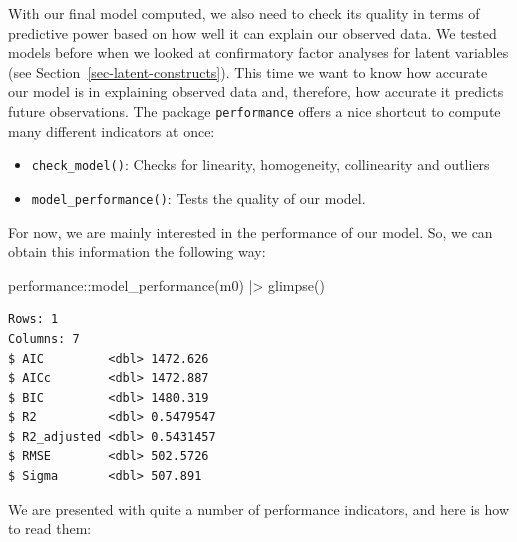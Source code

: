 \documentclass[
  letterpaper,
]{krantz}
\makeatletter
\newenvironment{Shaded}{\begin{snugshade}}{\end{snugshade}}
\newcommand{\FunctionTok}[1]{\textcolor[rgb]{0.28,0.35,0.67}{#1}}
\newcommand{\NormalTok}[1]{\textcolor[rgb]{0.00,0.23,0.31}{#1}}
\newcommand{\SpecialCharTok}[1]{\textcolor[rgb]{0.37,0.37,0.37}{#1}}
\newenvironment{kframe}{%
\medskip{}
\setlength{\fboxsep}{.8em}
 \def\at@end@of@kframe{}%
 \ifinner\ifhmode%
  \def\at@end@of@kframe{\end{minipage}}%
  \begin{minipage}{\columnwidth}%
 \fi\fi%
 \def\FrameCommand##1{\hskip\@totalleftmargin \hskip-\fboxsep
 \colorbox{shadecolor}{##1}\hskip-\fboxsep
     \hskip-\linewidth \hskip-\@totalleftmargin \hskip\columnwidth}%
 \MakeFramed {\advance\hsize-\width
   \@totalleftmargin\z@ \linewidth\hsize
   \@setminipage}}%
 {\par\unskip\endMakeFramed%
 \at@end@of@kframe}
\renewenvironment{Shaded}{\begin{kframe}}{\end{kframe}}
\makeatother
\begin{document}
With our final model computed, we also need to check its quality in
terms of predictive power based on how well it can explain our observed
data. We tested models before when we looked at confirmatory factor
analyses for latent variables (see Section~\ref{sec-latent-constructs}).
This time we want to know how accurate our model is in explaining
observed data and, therefore, how accurate it predicts future
observations. The package \texttt{performance} offers a nice shortcut to
compute many different indicators at once:

\begin{itemize}
\item
  \texttt{check\_model()}: Checks for linearity, homogeneity,
  collinearity and outliers
\item
  \texttt{model\_performance()}: Tests the quality of our model.
\end{itemize}

For now, we are mainly interested in the performance of our model. So,
we can obtain this information the following way:

\begin{Shaded}
\begin{Highlighting}[]
\NormalTok{performance}\SpecialCharTok{::}\FunctionTok{model\_performance}\NormalTok{(m0) }\SpecialCharTok{|\textgreater{}}
  \FunctionTok{glimpse}\NormalTok{()}
\end{Highlighting}
\end{Shaded}

\begin{verbatim}
Rows: 1
Columns: 7
$ AIC         <dbl> 1472.626
$ AICc        <dbl> 1472.887
$ BIC         <dbl> 1480.319
$ R2          <dbl> 0.5479547
$ R2_adjusted <dbl> 0.5431457
$ RMSE        <dbl> 502.5726
$ Sigma       <dbl> 507.891
\end{verbatim}

We are presented with quite a number of performance indicators, and here
is how to read them:
\end{document}
